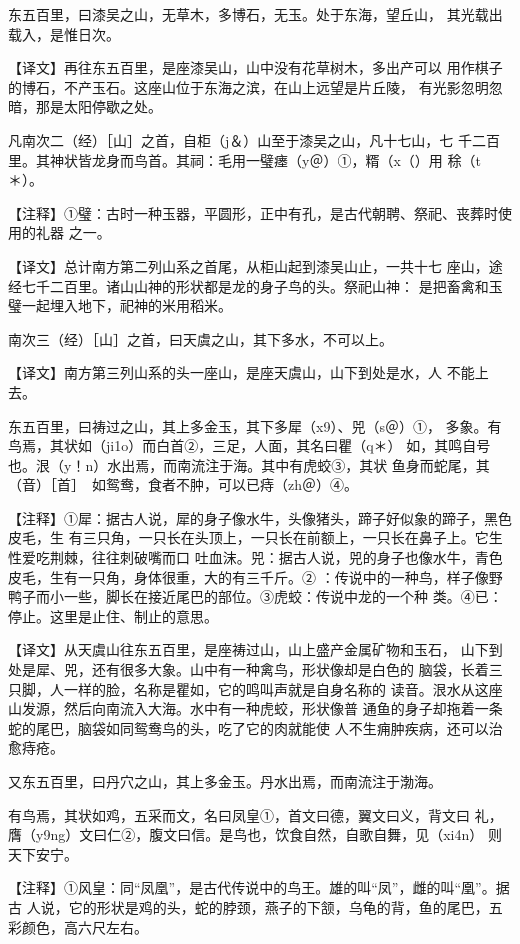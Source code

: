 \documentclass[a4paper,12pt,UTF8,twoside]{ctexbook}
\begin{document}
东五百里，曰漆吴之山，无草木，多博石，无玉。处于东海，望丘山， 其光载出载入，是惟日次。

【译文】再往东五百里，是座漆吴山，山中没有花草树木，多出产可以 用作棋子的博石，不产玉石。这座山位于东海之滨，在山上远望是片丘陵， 有光影忽明忽暗，那是太阳停歇之处。

凡南次二（经）［山］之首，自柜（j＆）山至于漆吴之山，凡十七山，七 千二百里。其神状皆龙身而鸟首。其祠：毛用一璧瘗（y＠）①，糈（x（）用 稌（t＊）。

【注释】①璧：古时一种玉器，平圆形，正中有孔，是古代朝聘、祭祀、丧葬时使用的礼器 之一。

【译文】总计南方第二列山系之首尾，从柜山起到漆吴山止，一共十七 座山，途经七千二百里。诸山山神的形状都是龙的身子鸟的头。祭祀山神： 是把畜禽和玉璧一起埋入地下，祀神的米用稻米。

南次三（经）［山］之首，曰天虞之山，其下多水，不可以上。

【译文】南方第三列山系的头一座山，是座天虞山，山下到处是水，人 不能上去。

东五百里，曰祷过之山，其上多金玉，其下多犀（x9）、兕（s＠）①， 多象。有鸟焉，其状如（ji1o）而白首②，三足，人面，其名曰瞿（q＊） 如，其鸣自号也。泿（y！n）水出焉，而南流注于海。其中有虎蛟③，其状 鱼身而蛇尾，其（音）［首］　如鸳鸯，食者不肿，可以已痔（zh＠）④。

【注释】①犀：据古人说，犀的身子像水牛，头像猪头，蹄子好似象的蹄子，黑色皮毛，生 有三只角，一只长在头顶上，一只长在前额上，一只长在鼻子上。它生性爱吃荆棘，往往刺破嘴而口 吐血沫。兕：据古人说，兕的身子也像水牛，青色皮毛，生有一只角，身体很重，大的有三千斤。② ：传说中的一种鸟，样子像野鸭子而小一些，脚长在接近尾巴的部位。③虎蛟：传说中龙的一个种 类。④已：停止。这里是止住、制止的意思。

【译文】从天虞山往东五百里，是座祷过山，山上盛产金属矿物和玉石， 山下到处是犀、兕，还有很多大象。山中有一种禽鸟，形状像却是白色的 脑袋，长着三只脚，人一样的脸，名称是瞿如，它的鸣叫声就是自身名称的 读音。泿水从这座山发源，然后向南流入大海。水中有一种虎蛟，形状像普 通鱼的身子却拖着一条蛇的尾巴，脑袋如同鸳鸯鸟的头，吃了它的肉就能使 人不生痈肿疾病，还可以治愈痔疮。

又东五百里，曰丹穴之山，其上多金玉。丹水出焉，而南流注于渤海。

有鸟焉，其状如鸡，五采而文，名曰凤皇①，首文曰德，翼文曰义，背文曰 礼，膺（y9ng）文曰仁②，腹文曰信。是鸟也，饮食自然，自歌自舞，见（xi4n） 则天下安宁。

【注释】①风皇：同“凤凰”，是古代传说中的鸟王。雄的叫“凤”，雌的叫“凰”。据古 人说，它的形状是鸡的头，蛇的脖颈，燕子的下颔，乌龟的背，鱼的尾巴，五彩颜色，高六尺左右。
\end{document}
